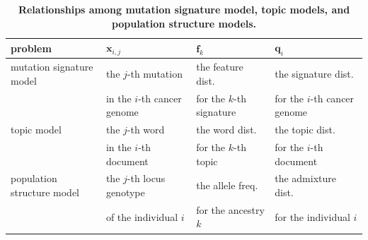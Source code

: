 \begin{table}[!ht]
\caption{
{\bf Relationships among mutation signature model, topic models, and population structure models.}
}
\begin{center}
\begin{tabular}{|l|l|l|l|} \hline
problem & $\bm{x}_{i,j}$ & $\bm{f}_{k}$ & $\bm{q}_{i}$  \\ \hline
mutation signature model & the $j$-th mutation  & the feature dist.  & the signature dist.  \\
& in the $i$-th cancer genome & for the $k$-th signature & for the $i$-th cancer genome \\ \hline
topic model &  the $j$-th word & the word dist. & the topic dist. \\ 
& in the $i$-th document & for the $k$-th topic & for the $i$-th document \\ \hline
population structure model & the $j$-th locus genotype & the allele freq.  & the admixture dist. \\
& of the individual $i$  & for the ancestry $k$ & for the individual $i$ \\
\hline 
\end{tabular}
\end{center}
\label{tab_pop}
\end{table}


\clearpage

